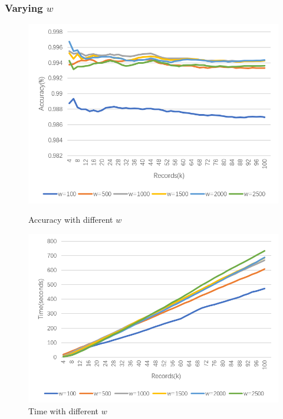\documentclass[runningheads]{llncs}
\begin{document}
	\subsubsection{Varying $w$}
	\begin{figure}
		\centering
		\begin{minipage}[t]{0.46\textwidth}
			\centering
			\includegraphics[width=1.0\textwidth]{figure-w-accuracy}
			\caption{Accuracy with different $w$}
			\label{fig:accuracy:w}
		\end{minipage}
		\hspace{3mm}
		\begin{minipage}[t]{0.46\textwidth}
			\centering
			\includegraphics[width=1.0\textwidth]{figure-w-time}
			\caption{Time with different $w$}
			\label{fig:time:w}
		\end{minipage}%
	\end{figure}
	
\end{document}

